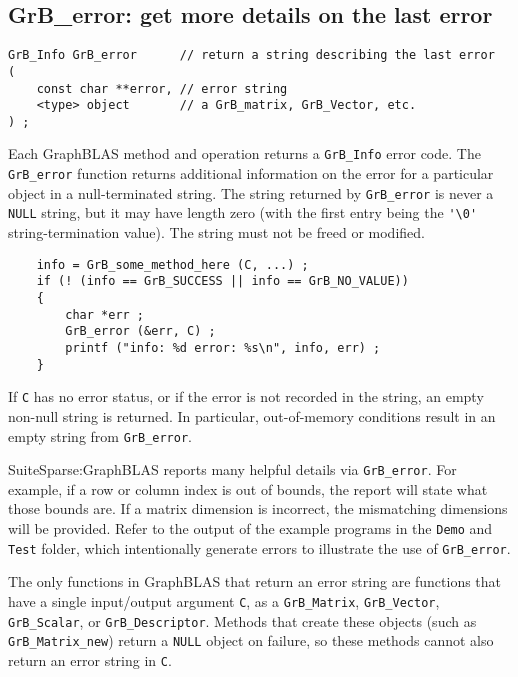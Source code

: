 \documentclass[12pt]{article}
\begin{document}
\newpage
\subsection{{\sf GrB\_error:} get more details on the last error} %
\label{error}

\begin{mdframed}[userdefinedwidth=6in]
{\footnotesize
\begin{verbatim}
GrB_Info GrB_error      // return a string describing the last error
(
    const char **error, // error string
    <type> object       // a GrB_matrix, GrB_Vector, etc.
) ;
\end{verbatim}
}\end{mdframed}

Each GraphBLAS method and operation returns a \verb'GrB_Info' error code.  The
\verb'GrB_error' function returns additional information on the error for a
particular object in a null-terminated string.  The string returned by
\verb'GrB_error' is never a \verb'NULL' string, but it may have length zero
(with the first entry being the \verb"'\0'" string-termination value).  The
string must not be freed or modified.

    {\footnotesize
    \begin{verbatim}
    info = GrB_some_method_here (C, ...) ;
    if (! (info == GrB_SUCCESS || info == GrB_NO_VALUE))
    {
        char *err ;
        GrB_error (&err, C) ;
        printf ("info: %d error: %s\n", info, err) ;
    } \end{verbatim}}

If \verb'C' has no error status, or if the error is not recorded in
the string, an empty non-null string is returned.  In particular,
out-of-memory conditions result in an empty string from \verb'GrB_error'.

SuiteSparse:GraphBLAS reports many helpful details via \verb'GrB_error'.  For
example, if a row or column index is out of bounds, the report will state what
those bounds are.  If a matrix dimension is incorrect, the mismatching
dimensions will be provided.  Refer to
the output of the example programs in the \verb'Demo' and \verb'Test' folder,
which intentionally generate errors to illustrate the use of \verb'GrB_error'.

The only functions in GraphBLAS that return an error string are functions that
have a single input/output argument \verb'C', as a \verb'GrB_Matrix',
\verb'GrB_Vector', \verb'GrB_Scalar', or \verb'GrB_Descriptor'. Methods that
create these objects (such as \verb'GrB_Matrix_new') return a \verb'NULL'
object on failure, so these methods cannot also return an error string in
\verb'C'.
\end{document}
